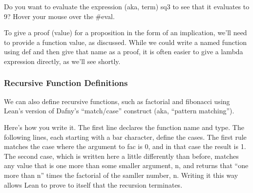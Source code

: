 \documentclass[letterpaper,10pt,english]{sphinxmanual}
\begin{document}
\begin{sphinxVerbatim}[commandchars=\\\{\}]
 
\end{sphinxVerbatim}

Do you want to evaluate the expression (aka, term) sq3 to see that it
evaluates to 9? Hover your mouse over the \#eval.

\begin{sphinxVerbatim}[commandchars=\\\{\}]
 
\end{sphinxVerbatim}

To give a proof (value) for a proposition in the form of an
implication, we’ll need to provide a function value, as discussed.
While we could write a named function using def and then give that
name as a proof, it is often easier to give a lambda expression
directly, as we’ll see shortly.


\subsubsection{Recursive Function Definitions}
\label{\detokenize{15-proofs:recursive-function-definitions}}
We can also define recursive functions, such as factorial and
fibonacci using Lean’s version of Dafny’s “match/case” construct (aka,
“pattern matching”).

Here’s how you write it. The first line declares the function name and
type. The following lines, each starting with a bar character, define
the cases. The first rule matches the case where the argument to fac
is 0, and in that case the result is 1. The second case, which is
written here a little differently than before, matches any value that
is one more than some smaller argument, n, and returns that “one more
than n” times the factorial of the samller number, n. Writing it this
way allows Lean to prove to itself that the recursion terminates.

\begin{sphinxVerbatim}[commandchars=\\\{\}]
    
   
          
\end{sphinxVerbatim}
\end{document}
